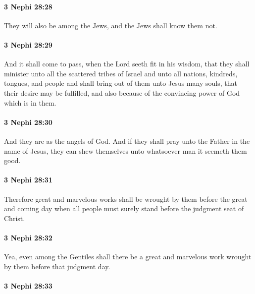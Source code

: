 		\paragraph{3 Nephi 28:28} %
			\label{3NEPHI-28-28}

			They will also be among the Jews,
			and the Jews shall know them not.

		\paragraph{3 Nephi 28:29} %
			\label{3NEPHI-28-29}

			And it shall come to pass, when the Lord seeth fit in his wisdom,
			that they shall minister unto all the scattered tribes of Israel
			and unto all nations, kindreds, tongues, and people
			and shall bring out of them unto Jesus many souls,
			that their desire may be fulfilled,
			and also because of the convincing power of God which is in them.

		\paragraph{3 Nephi 28:30} %
			\label{3NEPHI-28-30}

			And they are as the angels of God.
			And if they shall pray unto the Father in the name of Jesus,
			they can shew themselves unto whatsoever man it seemeth them good.

		\paragraph{3 Nephi 28:31} %
			\label{3NEPHI-28-31}

			Therefore great and marvelous works shall be wrought by them
			before the great and coming day
			when all people must surely stand before the judgment seat of Christ.

		\paragraph{3 Nephi 28:32} %
			\label{3NEPHI-28-32}

			Yea, even among the Gentiles shall there be
			a great and marvelous work wrought by them before that judgment day.

		\paragraph{3 Nephi 28:33} %
			\label{3NEPHI-28-33}

